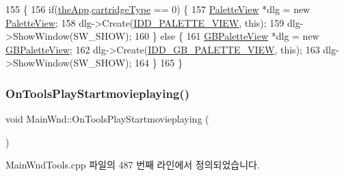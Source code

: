 \begin{DoxyCode}
155 \{
156   \textcolor{keywordflow}{if}(\mbox{\hyperlink{_v_b_a_8cpp_a8095a9d06b37a7efe3723f3218ad8fb3}{theApp}}.\mbox{\hyperlink{class_v_b_a_af300759fcbc7eeb00ce73f956fc5ddb7}{cartridgeType}} == 0) \{
157     \mbox{\hyperlink{class_palette_view}{PaletteView}} *dlg = \textcolor{keyword}{new} \mbox{\hyperlink{class_palette_view}{PaletteView}};
158     dlg->Create(\mbox{\hyperlink{resource_8h_aa7ccbd466e0d30ecc9986b69890c4182}{IDD\_PALETTE\_VIEW}}, \textcolor{keyword}{this});
159     dlg->ShowWindow(SW\_SHOW);
160   \} \textcolor{keywordflow}{else} \{
161     \mbox{\hyperlink{class_g_b_palette_view}{GBPaletteView}} *dlg = \textcolor{keyword}{new} \mbox{\hyperlink{class_g_b_palette_view}{GBPaletteView}};
162     dlg->Create(\mbox{\hyperlink{resource_8h_aa816696d6cfad8adb7de1dc52637b173}{IDD\_GB\_PALETTE\_VIEW}}, \textcolor{keyword}{this});
163     dlg->ShowWindow(SW\_SHOW);
164   \}
165 \}
\end{DoxyCode}
\mbox{\label{class_main_wnd_a96ea89975374d5b7a434070d58e9c260}} 
\subsubsection{\texorpdfstring{On\+Tools\+Play\+Startmovieplaying()}{OnToolsPlayStartmovieplaying()}}
{\footnotesize\ttfamily void Main\+Wnd\+::\+On\+Tools\+Play\+Startmovieplaying (\begin{DoxyParamCaption}{ }\end{DoxyParamCaption})\hspace{0.3cm}{\ttfamily [protected]}}



Main\+Wnd\+Tools.\+cpp 파일의 487 번째 라인에서 정의되었습니다.


